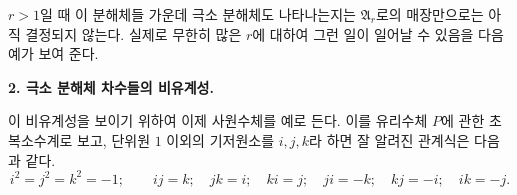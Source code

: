 \documentclass[11pt]{article}
\providecommand{\mA}{\mathfrak{A}}
\begin{document}
$r>1$일 때 이 분해체들 가운데 극소 분해체도 나타나는지는 $\mA_r$로의 매장만으로는 아직 결정되지 않는다. 실제로 무한히 많은 $r$에 대하여 그런 일이 일어날 수 있음을 다음 예가 보여 준다.

\begin{center}
\textbf{2. 극소 분해체 차수들의 비유계성.}
\end{center}

이 비유계성을 보이기 위하여 이제 사원수체를 예로 든다. 이를 유리수체 $P$에 관한 초복소수계로 보고, 단위원 $1$ 이외의 기저원소를 $i,j,k$라 하면 잘 알려진 관계식은 다음과 같다.
\[
 i^2=j^2=k^2=-1;\qquad ij=k;\quad jk=i;\quad ki=j;\quad ji=-k;\quad kj=-i;\quad ik=-j.
\]
\end{document}

